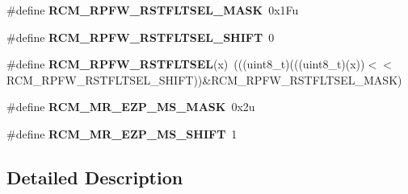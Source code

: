 \begin{DoxyCompactItemize}
\item 
\#define {\bfseries R\+C\+M\+\_\+\+R\+P\+F\+W\+\_\+\+R\+S\+T\+F\+L\+T\+S\+E\+L\+\_\+\+M\+A\+SK}~0x1\+Fu\hypertarget{group__RCM__Register__Masks_ga60f29f78d245476ae9716d81b5728739}{}\label{group__RCM__Register__Masks_ga60f29f78d245476ae9716d81b5728739}

\item 
\#define {\bfseries R\+C\+M\+\_\+\+R\+P\+F\+W\+\_\+\+R\+S\+T\+F\+L\+T\+S\+E\+L\+\_\+\+S\+H\+I\+FT}~0\hypertarget{group__RCM__Register__Masks_ga489d9757284af48af000b769d36bf21a}{}\label{group__RCM__Register__Masks_ga489d9757284af48af000b769d36bf21a}

\item 
\#define {\bfseries R\+C\+M\+\_\+\+R\+P\+F\+W\+\_\+\+R\+S\+T\+F\+L\+T\+S\+EL}(x)~(((uint8\+\_\+t)(((uint8\+\_\+t)(x))$<$$<$R\+C\+M\+\_\+\+R\+P\+F\+W\+\_\+\+R\+S\+T\+F\+L\+T\+S\+E\+L\+\_\+\+S\+H\+I\+FT))\&R\+C\+M\+\_\+\+R\+P\+F\+W\+\_\+\+R\+S\+T\+F\+L\+T\+S\+E\+L\+\_\+\+M\+A\+SK)\hypertarget{group__RCM__Register__Masks_ga2b2127fc8187199672452ef9f62f6a89}{}\label{group__RCM__Register__Masks_ga2b2127fc8187199672452ef9f62f6a89}

\item 
\#define {\bfseries R\+C\+M\+\_\+\+M\+R\+\_\+\+E\+Z\+P\+\_\+\+M\+S\+\_\+\+M\+A\+SK}~0x2u\hypertarget{group__RCM__Register__Masks_ga16d5d09d05454765c2097d0728ba9494}{}\label{group__RCM__Register__Masks_ga16d5d09d05454765c2097d0728ba9494}

\item 
\#define {\bfseries R\+C\+M\+\_\+\+M\+R\+\_\+\+E\+Z\+P\+\_\+\+M\+S\+\_\+\+S\+H\+I\+FT}~1\hypertarget{group__RCM__Register__Masks_ga3fd9237201ed39d58be104c022385815}{}\label{group__RCM__Register__Masks_ga3fd9237201ed39d58be104c022385815}

\end{DoxyCompactItemize}


\subsection{Detailed Description}
